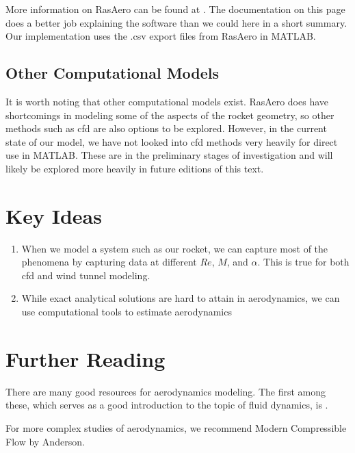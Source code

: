 \documentclass[12pt]{report}
\begin{document}
More information on RasAero can be found at \cite{rogers_rasaero_2019}. The documentation on this page does a better job explaining the software than we could here in a short summary. Our implementation uses the .csv export files from RasAero in MATLAB.
\subsection{Other Computational Models}
It is worth noting that other computational models exist. RasAero does have shortcomings in modeling some of the aspects of the rocket geometry, so other methods such as \gls{cfd} are also options to be explored. However, in the current state of our model, we have not looked into \gls{cfd} methods very heavily for direct use in MATLAB. These are in the preliminary stages of investigation and will likely be explored more heavily in future editions of this text.

\section{Key Ideas}
\begin{enumerate}
    \item When we model a system such as our rocket, we can capture most of the phenomena by capturing data at different $Re$, $M$, and $\alpha$. This is true for both \gls{cfd} and wind tunnel modeling.
    \item While exact analytical solutions are hard to attain in aerodynamics, we can use computational tools to estimate aerodynamics
\end{enumerate}

\section{Further Reading}

There are many good resources for aerodynamics modeling. The first among these, which serves as a good introduction to the topic of fluid dynamics, is \cite{anderson_fundamentals_2017}.

For more complex studies of aerodynamics, we recommend Modern Compressible Flow by Anderson.
\end{document}
